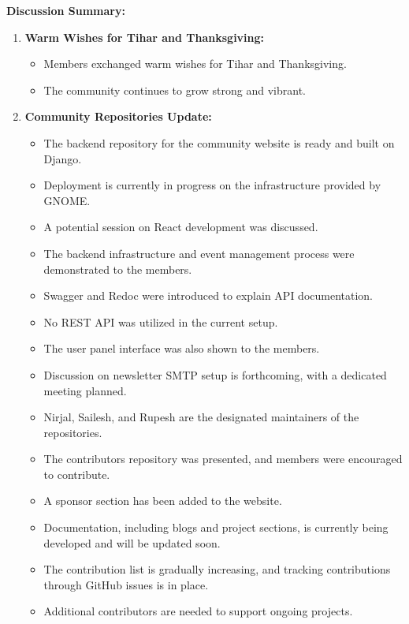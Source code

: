 \documentclass[a4paper,11pt]{article}
\begin{document}
\vspace{0.5cm}

\newpage
\noindent\textbf{Discussion Summary:}
\begin{enumerate}[label=\arabic*.]
    \item \textbf{Warm Wishes for Tihar and Thanksgiving:} \\
    \begin{itemize}
        \item Members exchanged warm wishes for Tihar and Thanksgiving.
        \item The community continues to grow strong and vibrant.
    \end{itemize}

    \item \textbf{Community Repositories Update:} \\
    \begin{itemize}
        \item The backend repository for the community website is ready and built on Django.
        \item Deployment is currently in progress on the infrastructure provided by GNOME.
        \item A potential session on React development was discussed.
        \item The backend infrastructure and event management process were demonstrated to the members.
        \item Swagger and Redoc were introduced to explain API documentation.
        \item No REST API was utilized in the current setup.
        \item The user panel interface was also shown to the members.
        \item Discussion on newsletter SMTP setup is forthcoming, with a dedicated meeting planned.
        \item Nirjal, Sailesh, and Rupesh are the designated maintainers of the repositories.
        \item The contributors repository was presented, and members were encouraged to contribute.
        \item A sponsor section has been added to the website.
        \item Documentation, including blogs and project sections, is currently being developed and will be updated soon.
        \item The contribution list is gradually increasing, and tracking contributions through GitHub issues is in place.
        \item Additional contributors are needed to support ongoing projects.
    \end{itemize}


\end{enumerate}
\end{document}
